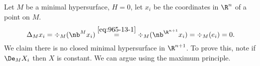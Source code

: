 
Let $M$ be a minimal hypersurface, $H=0$, let $x_i$ be the coordinates in $\R^n$ of a point on $M$. %
\[
\Delta_M x_i =\div_M(\nb^M x_i)\stackrel{\ref{eq:965-13-1}}=\div_M(\nb^{\R^{n+1}}x_i) =\div_M(e_i)=0.
\]
We claim there is no closed minimal hypersurface in $\R^{n+1}$. To prove this, note if $\De_{M}X_i$ then $X$ is constant. We can argue using the maximum principle.

%
%
%
%
